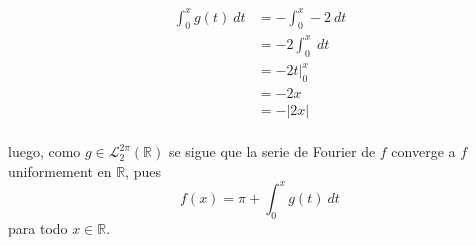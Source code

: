 \documentclass[12pt]{report}
\newcounter{it}
\theoremstyle{largebreak}
\newcommand\abs[1]{\ensuremath{\left|#1\right|}}
\begin{document}
\begin{sol}
\begin{itemize}
            \begin{equation*}
                \begin{split}
                    \int_{0}^{x}g(t)\:dt&=-\int_0^x -2\:dt\\
                    &=-2\int_0^x\:dt\\
                    &=-2t\Big|_{0}^x\\
                    &=-2x\\
                    &=-\abs{2x}\\
                \end{split}
            \end{equation*}
        \end{itemize}
        luego, como $g\in\mathcal{L}_2^{2\pi}(\mathbb{R})$ se sigue que la serie de Fourier de $f$ converge a $f$ uniformement en $\mathbb{R}$, pues
        \begin{equation*}
            f(x)=\pi+\int_{0}^{x}g(t)\:dt
        \end{equation*}
        para todo $x\in\mathbb{R}$.


\end{sol}
\end{document}
